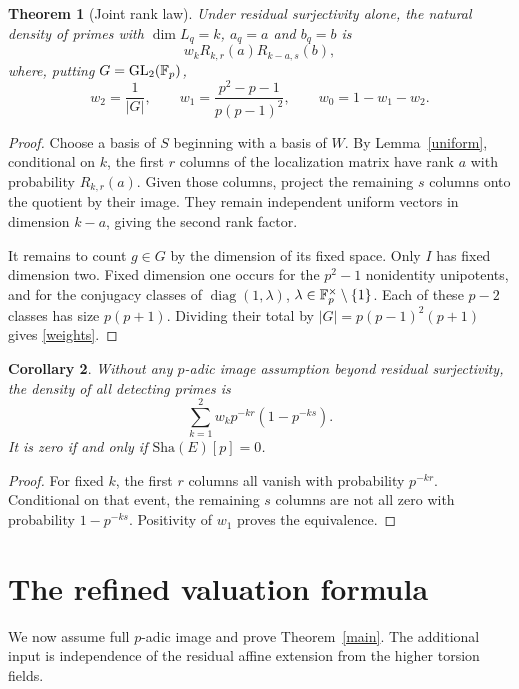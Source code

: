 \documentclass[11pt]{article}
\newtheorem{theorem}{Theorem}[section]
\newtheorem{corollary}[theorem]{Corollary}
\theoremstyle{remark}\newtheorem{remark}[theorem]{Remark}
\newcommand{\Sha}{\mathop{\text{\fontencoding{U}\fontfamily{wncy}\selectfont\symbol{88}}}}
\renewcommand{\Sha}{\mathrm{Sha}}
\begin{document}
\begin{theorem}[Joint rank law]\label{rank}
Under residual surjectivity alone, the natural density of primes with $\dim L_q=k$, $a_q=a$ and $b_q=b$ is
\begin{equation}\label{joint}
 \boxed{w_k R_{k,r}(a)R_{k-a,s}(b)},
\end{equation}
where, putting $G=\operatorname{GL}_2(\mathbb F_p)$,
\begin{equation}\label{weights}
 w_2=\frac1{|G|},\qquad w_1=\frac{p^2-p-1}{p(p-1)^2},\qquad
 w_0=1-w_1-w_2.
\end{equation}
\end{theorem}
\begin{proof}
Choose a basis of $S$ beginning with a basis of $W$. By Lemma~\ref{uniform}, conditional on $k$, the first $r$ columns of the localization matrix have rank $a$ with probability $R_{k,r}(a)$. Given those columns, project the remaining $s$ columns onto the quotient by their image. They remain independent uniform vectors in dimension $k-a$, giving the second rank factor.

It remains to count $g\in G$ by the dimension of its fixed space. Only $I$ has fixed dimension two. Fixed dimension one occurs for the $p^2-1$ nonidentity unipotents, and for the conjugacy classes of $\operatorname{diag}(1,\lambda)$, $\lambda\in\mathbb F_p^\times\setminus\{1\}$. Each of these $p-2$ classes has size $p(p+1)$. Dividing their total by $|G|=p(p-1)^2(p+1)$ gives \eqref{weights}.
\end{proof}

\begin{corollary}\label{all}
Without any $p$-adic image assumption beyond residual surjectivity, the density of all detecting primes is
\[
 \sum_{k=1}^{2}w_kp^{-kr}(1-p^{-ks}).
\]
It is zero if and only if $\Sha(E)[p]=0$.
\end{corollary}
\begin{proof}
For fixed $k$, the first $r$ columns all vanish with probability $p^{-kr}$. Conditional on that event, the remaining $s$ columns are not all zero with probability $1-p^{-ks}$. Positivity of $w_1$ proves the equivalence.
\end{proof}

\section{The refined valuation formula}
We now assume full $p$-adic image and prove Theorem~\ref{main}. The additional input is independence of the residual affine extension from the higher torsion fields.
\end{document}
